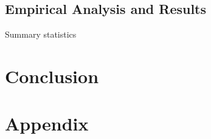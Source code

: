 \documentclass[12pt]{article}
\numberwithin{table}{section}   %
\begin{document}
\subsection{Empirical Analysis and Results}

\begin{table}[!htbp]
    \caption{Summary statistics} \label{tab:table1}
    \centering
    
\end{table}



\break

\section{Conclusion}

\break

\section{Appendix}

\begin{singlespace}

    
    
    
    \break
    
    
\end{singlespace}
\end{document}
